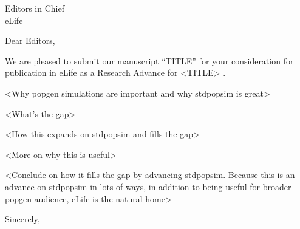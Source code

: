 \documentclass[10pt,stdletter,dateno]{letter}
\begin{document}
\signature{\vspace{-40pt} M. Elise Lauterbur,\\
                          on behalf of stdpopsim authors}
\address{
  409A BioSciences West\\
  Department of Ecology\\and Evolutionary Biology\\
  1041 E Lowell St\\
  Tucson, AZ 85719
}

\begin{letter}{
  Editors in Chief \\ 
  eLife 
}

\opening{Dear Editors,}

We are pleased to submit our manuscript “TITLE” for your consideration for publication in eLife as a Research Advance for <TITLE> \citep{Adrion2020}.

<Why popgen simulations are important and why stdpopsim is great>

<What's the gap>

<How this expands on stdpopsim and fills the gap>

<More on why this is useful>

<Conclude on how it fills the gap by advancing stdpopsim. Because this is an advance on stdpopsim in lots of ways, in addition to being useful for broader popgen audience, eLife is the natural home>

\closing{Sincerely,}




\end{letter}
\end{document}

